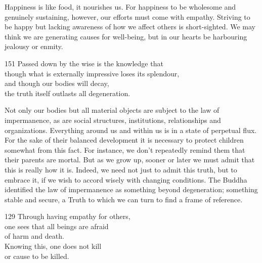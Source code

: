 \begin{dhpRefl}
  Happiness is like food, it nourishes us. For happiness to be wholesome and
  genuinely sustaining, however, our efforts must come with empathy. Striving to
  be happy but lacking awareness of how we affect others is short-sighted. We
  may think we are generating causes for well-being, but in our hearts be
  harbouring jealousy or enmity.
\end{dhpRefl}


\begin{dhpVerse}{151}
\label{dhp-151}
Passed down by the wise is the knowledge that\\
though what is externally impressive loses its splendour,\\
and though our bodies will decay,\\
the truth itself outlasts all degeneration.
\end{dhpVerse}

\begin{dhpRefl}
  Not only our bodies but all material objects are subject to the law of
  impermanence, as are social structures, institutions, relationships and
  organizations. Everything around us and within us is in a state of perpetual
  flux. For the sake of their balanced development it is necessary to protect
  children somewhat from this fact. For instance, we don't repeatedly remind
  them that their parents are mortal. But as we grow up, sooner or later we must
  admit that this is really how it is. Indeed, we need not just to admit this
  truth, but to embrace it, if we wish to accord wisely with changing
  conditions. The Buddha identified the law of impermanence as something beyond
  degeneration; something stable and secure, a Truth to which we can turn to
  find a frame of reference.
\end{dhpRefl}


\begin{dhpVerse}{129}
\label{dhp-129}
Through having empathy for others,\\
one sees that all beings are afraid\\
of harm and death.\\
Knowing this, one does not kill\\
or cause to be killed.
\end{dhpVerse}

